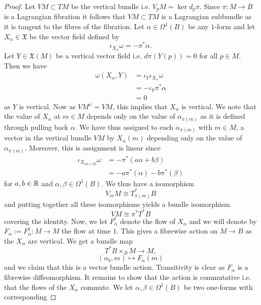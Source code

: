 \begin{proof}
    Let $VM \subset TM$ be the vertical bundle i.e. $V_pM = \ker d_p\pi$. Since $\pi: M \to B$ is a Lagrangian fibration it follows that $VM \subset TM$ is a Lagrangian subbundle as
    it is tangent to the fibres of the fibration. Let $\alpha \in \Omega^1(B)$ be any $1$-form and let $X_{\alpha} \in \mathfrak{X}$ be the vector field defined by
    $$
        \iota_{X_{\alpha}}\omega = -\pi^*\alpha.
    $$
    Let $Y \in \mathfrak{X}(M)$ be a vertical vector field i.e. $d\pi(Y(p)) = 0$ for all $p \in M$. Then we have
    \begin{align*}
        \omega(X_{\alpha}, Y) & = \iota_Y \iota_{X_{\alpha}} \omega \\
                              & = -\iota_Y\pi^*\alpha               \\
                              & = 0
    \end{align*}
    as $Y$ is vertical. Now as $VM^{\omega} = VM$, this implies that $X_{\alpha}$ is vertical. We note that the value of $X_{\alpha}$ at $m \in M$ depends only on the value of $\alpha_{\pi(m)}$ as it is defined through pulling back $\alpha$.
    We have thus assigned to each $\alpha_{\pi(m)}$ with $m \in M$, a vector in the vertical bundle $VM$ by $X_{\alpha} (m)$ depending only on the value of $\alpha_{\pi(m)}$. Moreover, this is assignment is linear since
    \begin{align*}
        \iota_{X_{a\alpha + b\beta}}\omega & = -\pi^* (a\alpha + b\beta)       \\
                                           & = -a\pi^* (\alpha) -b\pi^*(\beta)
    \end{align*}
    for $a,b \in \mathbb{R}$ and $\alpha, \beta \in \Omega^1(B)$. We thus have a  isomorphism
    $$
        V_m M \cong T^*_{\pi(m)}B
    $$
    and putting together all these isomorphisms yields a bundle isomorphism
    $$
        VM \cong \pi^*T^*B
    $$
    covering the identity. Now, we let $F^t_{\alpha}$ denote the flow of $X_{\alpha}$ and we will denote by
    $F_{\alpha} := F_{\alpha}^1: M \to M$ the flow at time $1$. This gives a fibrewise action on $M \to B$ as
    the $X_{\alpha}$ are vertical. We get a bundle map
    $$
        T^*B \times_B M \to M,
    $$
    $$(\alpha_b, m) \mapsto F_{\alpha}(m)$$
    and we claim that this is a vector bundle action. Transitivity is clear as $F_{\alpha}$ is a fibrewise diffeomorphism. It remains to show that
    the action is commutative i.e. that the flows of the $X_{\alpha}$ commute. We let $\alpha, \beta \in \Omega^1(B)$ be two one-forms with corresponding

\end{proof}
